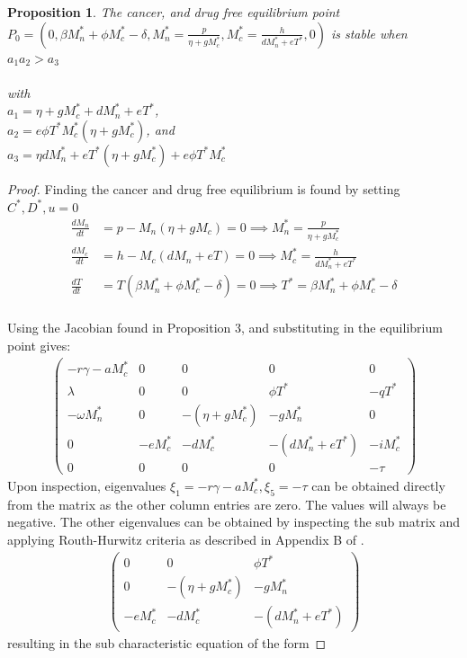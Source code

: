 \documentclass[11pt]{article}
\newtheorem{proposition}{Proposition}
\theoremstyle{definition}
\begin{document}
\begin{proposition}
  The cancer, and drug free equilibrium point $P_0 = (0, \beta M_n^* + \phi M_c^* - \delta,M_n^* = \frac{p}{\eta + gM_c^*},M_c^* = \frac{h}{dM_n^* + eT^*}, 0) $ is stable when $a_1a_2 > a_3$
  \\
\\
  with
  \\ $a_1 =\eta + gM_c^* + dM_n^* + eT^*$,
  \\
  $a_2 = e\phi T^* M_c^*(\eta + gM_c^*)$, and 
  \\$a_3 = \eta d M_n^* + eT^*(\eta + gM_c^*) + e\phi T^* M_c^*$
\end{proposition}
\begin{proof}

Finding the cancer and drug free equilibrium is found by setting $C^*, D^*, u = 0$
\begin{align*}
\frac{dM_n}{dt} &= p - M_n(\eta + gM_c) = 0 \implies M_n^* = \frac{p}{\eta + gM_c^*}\\
\frac{dM_c}{dt} &= h - M_c(dM_n + eT) = 0 \implies M_c^* = \frac{h}{dM_n^* + eT^*}\\
\frac{dT}{dt} &= T(\beta M_n^* + \phi M_c^* - \delta) = 0 \implies T^* = \beta M_n^* + \phi M_c^* - \delta\\
\end{align*}

\noindent Using the Jacobian found in Proposition 3, and substituting in the equilibrium point gives: 
\begin{align*}
\begin{pmatrix}
-r\gamma - aM_c^* & 0 & 0 & 0 & 0 \\[4pt]
\lambda & 0 & 0 & \phi T^* & -qT^* \\[4pt]
-\omega M_n^* & 0 & -(\eta + gM_c^*) & -gM_n^* & 0 \\[4pt]
0 & -eM_c^* & -dM_c^* & -(dM_n^* + eT^*) & -iM_c^* \\[4pt]
0 & 0 & 0 & 0 & -\tau
\end{pmatrix}
\end{align*}
\noindent Upon inspection, eigenvalues $\xi_1= -r\gamma - aM_c^*, \xi_5 =-\tau$ can be obtained directly from the matrix as the other column entries are zero. The values will always be negative. 
The other eigenvalues can be obtained by inspecting the sub matrix and applying Routh-Hurwitz criteria as described in Appendix B of \parencite{murray2002mathematical}. 
\begin{align*}
\begin{pmatrix}
  0 & 0 & \phi T^* \\
0 & -(\eta + gM_c^*) & -gM_n^* \\
-eM_c^* & -dM_c^* & -(dM_n^* + eT^*)
\end{pmatrix}
\end{align*}
\noindent resulting in the sub characteristic equation of the form


\end{proof}
\end{document}

